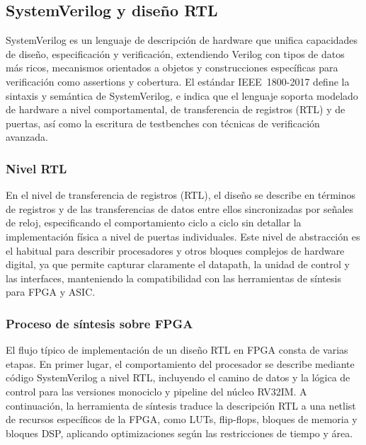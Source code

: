 \subsection{SystemVerilog y diseño RTL}

SystemVerilog es un lenguaje de descripción de hardware que unifica capacidades de diseño, especificación y verificación, extendiendo Verilog con tipos de datos más ricos, mecanismos orientados a objetos y construcciones específicas para verificación como assertions y cobertura. El estándar IEEE~1800-2017 define la sintaxis y semántica de SystemVerilog, e indica que el lenguaje soporta modelado de hardware a nivel comportamental, de transferencia de registros (RTL) y de puertas, así como la escritura de testbenches con técnicas de verificación avanzada.\parencite{IEEE2017SystemVerilog}


\subsubsection{Nivel RTL}

En el nivel de transferencia de registros (RTL), el diseño se describe en términos de registros y de las transferencias de datos entre ellos sincronizadas por señales de reloj, especificando el comportamiento ciclo a ciclo sin detallar la implementación física a nivel de puertas individuales. Este nivel de abstracción es el habitual para describir procesadores y otros bloques complejos de hardware digital, ya que permite capturar claramente el datapath, la unidad de control y las interfaces, manteniendo la compatibilidad con las herramientas de síntesis para FPGA y ASIC.\parencite{Chu2011FPGA}


\subsubsection{Proceso de síntesis sobre FPGA}

El flujo típico de implementación de un diseño RTL en FPGA consta de varias etapas. En primer lugar, el comportamiento del procesador se describe mediante código SystemVerilog a nivel RTL, incluyendo el camino de datos y la lógica de control para las versiones monociclo y pipeline del núcleo RV32IM. A continuación, la herramienta de síntesis traduce la descripción RTL a una netlist de recursos específicos de la FPGA, como LUTs, flip-flops, bloques de memoria y bloques DSP, aplicando optimizaciones según las restricciones de tiempo y área.\parencite{Chu2011FPGA}


